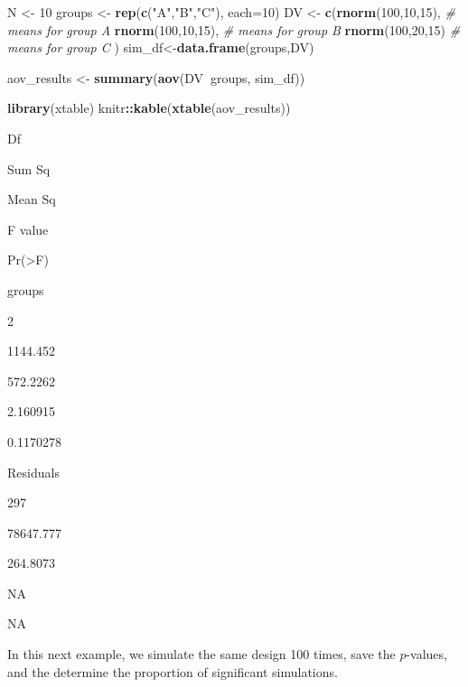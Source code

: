 \documentclass[
]{book}
\newenvironment{Shaded}{\begin{snugshade}}{\end{snugshade}}
\newcommand{\CommentTok}[1]{\textcolor[rgb]{0.56,0.35,0.01}{\textit{#1}}}
\newcommand{\DataTypeTok}[1]{\textcolor[rgb]{0.13,0.29,0.53}{#1}}
\newcommand{\DecValTok}[1]{\textcolor[rgb]{0.00,0.00,0.81}{#1}}
\newcommand{\KeywordTok}[1]{\textcolor[rgb]{0.13,0.29,0.53}{\textbf{#1}}}
\newcommand{\NormalTok}[1]{#1}
\newcommand{\OperatorTok}[1]{\textcolor[rgb]{0.81,0.36,0.00}{\textbf{#1}}}
\newcommand{\StringTok}[1]{\textcolor[rgb]{0.31,0.60,0.02}{#1}}
\begin{document}
\begin{Shaded}
\begin{Highlighting}[]
\NormalTok{N <-}\StringTok{ }\DecValTok{10}
\NormalTok{groups <-}\StringTok{ }\KeywordTok{rep}\NormalTok{(}\KeywordTok{c}\NormalTok{(}\StringTok{"A"}\NormalTok{,}\StringTok{"B"}\NormalTok{,}\StringTok{"C"}\NormalTok{), }\DataTypeTok{each=}\DecValTok{10}\NormalTok{)}
\NormalTok{DV <-}\StringTok{ }\KeywordTok{c}\NormalTok{(}\KeywordTok{rnorm}\NormalTok{(}\DecValTok{100}\NormalTok{,}\DecValTok{10}\NormalTok{,}\DecValTok{15}\NormalTok{),   }\CommentTok{# means for group A}
        \KeywordTok{rnorm}\NormalTok{(}\DecValTok{100}\NormalTok{,}\DecValTok{10}\NormalTok{,}\DecValTok{15}\NormalTok{),   }\CommentTok{# means for group B}
        \KeywordTok{rnorm}\NormalTok{(}\DecValTok{100}\NormalTok{,}\DecValTok{20}\NormalTok{,}\DecValTok{15}\NormalTok{)    }\CommentTok{# means for group C}
\NormalTok{        )}
\NormalTok{sim_df<-}\KeywordTok{data.frame}\NormalTok{(groups,DV)}

\NormalTok{aov_results <-}\StringTok{ }\KeywordTok{summary}\NormalTok{(}\KeywordTok{aov}\NormalTok{(DV}\OperatorTok{~}\NormalTok{groups, sim_df))}

\KeywordTok{library}\NormalTok{(xtable)}
\NormalTok{knitr}\OperatorTok{::}\KeywordTok{kable}\NormalTok{(}\KeywordTok{xtable}\NormalTok{(aov_results))}
\end{Highlighting}
\end{Shaded}

Df

Sum Sq

Mean Sq

F value

Pr(\textgreater F)

groups

2

1144.452

572.2262

2.160915

0.1170278

Residuals

297

78647.777

264.8073

NA

NA

In this next example, we simulate the same design 100 times, save the \(p\)-values, and the determine the proportion of significant simulations.
\end{document}
